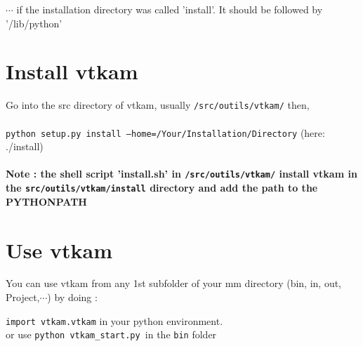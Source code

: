 \documentclass{article}
\begin{document}
$\cdots$ if the installation directory was called 'install'. It should be followed by '/lib/python'


\section{Install vtkam}

Go into the src directory of vtkam, usually 
\texttt{/src/outils/vtkam/}
then,\\ \\
\texttt{python setup.py install --home=/Your/Installation/Directory} (here: ./install)
\\ \\
\textbf{Note : the shell script 'install.sh' in \texttt{/src/outils/vtkam/} install vtkam in the \texttt{src/outils/vtkam/install} directory and add the path to the PYTHONPATH}


\section{Use vtkam}

You can use vtkam from any 1st subfolder of your mm directory (bin, in, out, Project,$\cdots$) by doing :

\texttt{import vtkam.vtkam} in your python environment.\\
or use \texttt{python vtkam\_start.py }in the \texttt{bin} folder
\end{document}
